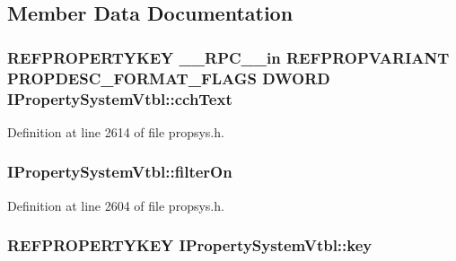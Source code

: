 \subsection{Member Data Documentation}
\subsubsection[{\texorpdfstring{cch\+Text}{cchText}}]{ {\bf R\+E\+F\+P\+R\+O\+P\+E\+R\+T\+Y\+K\+EY} {\bf \+\_\+\+\_\+\+R\+P\+C\+\_\+\+\_\+in} {\bf R\+E\+F\+P\+R\+O\+P\+V\+A\+R\+I\+A\+NT} {\bf P\+R\+O\+P\+D\+E\+S\+C\+\_\+\+F\+O\+R\+M\+A\+T\+\_\+\+F\+L\+A\+GS} {\bf D\+W\+O\+RD} I\+Property\+System\+Vtbl\+::cch\+Text}\hypertarget{struct_i_property_system_vtbl_ab9c1dba738c0a5120026024d79d9be6b}{}\label{struct_i_property_system_vtbl_ab9c1dba738c0a5120026024d79d9be6b}


Definition at line 2614 of file propsys.\+h.

\subsubsection[{\texorpdfstring{filter\+On}{filterOn}}]{ I\+Property\+System\+Vtbl\+::filter\+On}\hypertarget{struct_i_property_system_vtbl_a98431896a9a053b89a92b769bdd75f25}{}\label{struct_i_property_system_vtbl_a98431896a9a053b89a92b769bdd75f25}


Definition at line 2604 of file propsys.\+h.

\subsubsection[{\texorpdfstring{key}{key}}]{ {\bf R\+E\+F\+P\+R\+O\+P\+E\+R\+T\+Y\+K\+EY} I\+Property\+System\+Vtbl\+::key}\hypertarget{struct_i_property_system_vtbl_afb175f87c3bab192a7b348375440be97}{}\label{struct_i_property_system_vtbl_afb175f87c3bab192a7b348375440be97}


